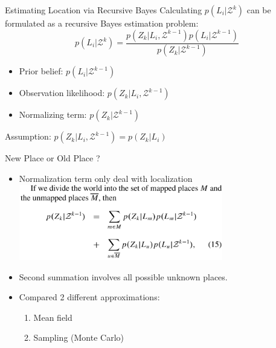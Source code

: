 \begin{frame}{Estimating Location via Recursive Bayes}
    Calculating $p(L_i|\mathcal{Z}^{k})$ can be formulated as a recursive Bayes estimation problem:
    \begin{equation*}
        p(L_i|\mathcal{Z}^{k}) = \frac{p(Z_k|L_i,\mathcal{Z}^{k-1})p(L_i|\mathcal{Z}^{k-1})}{p(Z_k|\mathcal{Z}^{k-1})}
    \end{equation*}
    \begin{itemize}
        \item Prior belief: $p(L_i|\mathcal{Z}^{k-1})$
        \item Observation likelihood: $p(Z_k|L_i,\mathcal{Z}^{k-1})$
        \item Normalizing term: $p(Z_k|\mathcal{Z}^{k-1})$
    \end{itemize}
    \vspace{0.5cm}
    Assumption: $p(Z_k|L_i,\mathcal{Z}^{k-1}) = p(Z_k|L_i)$
\end{frame}

\begin{frame}{New Place or Old Place ?}
    \begin{itemize}
        \item Normalization term only deal with localization\\ \vspace{0.3cm}
            \includegraphics[width=0.7\textwidth]{./media/nomalize_new.png}
        \item Second summation involves all possible unknown places.
        \item Compared 2 different approximations:
            \begin{enumerate}
                \item Mean field
                \item Sampling (Monte Carlo)
            \end{enumerate}
    \end{itemize}
\end{frame}

